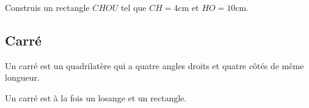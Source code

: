 \documentclass[a4paper,10pt]{report}
\begin{document}
\begin{ex}
Construis un rectangle $CHOU$ tel que $CH=4$cm et $HO=10$cm.

\noindent\grandscarreaux{\linewidth}{4.5cm}
\end{ex}

\vspace{-1.1cm}
\subsection{Carré}

\noindent \begin{minipage}{11cm}
\begin{defn}
\vspace{0.12cm}
Un carré est un quadrilatère qui a quatre angles droits et quatre côtés de même longueur.
\vspace{0.12cm}
\end{defn}
\medskip
\begin{rem}
Un carré est à la fois un losange et un rectangle.
\end{rem}
\end{minipage}
\end{document}
